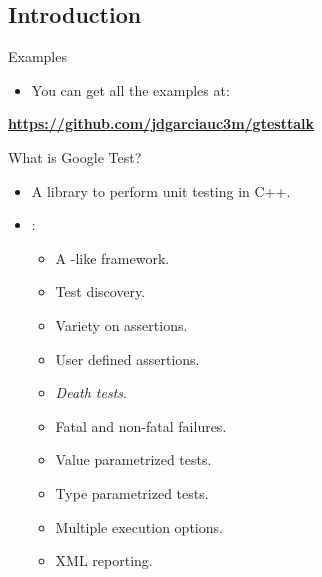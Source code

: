 \subsection{Introduction}

\begin{frame}[t]{Examples}
\begin{itemize}
  \item You can get all the examples at:
\end{itemize}
\vspace{1cm}
\large
\textbf{\url{https://github.com/jdgarciauc3m/gtesttalk}}
\end{frame}

\begin{frame}[t]{What is Google Test?}
\begin{itemize}
  \item A library to perform unit testing in C++.
  
  \vfill
  \item {}:
    \begin{itemize}
      \item A -like framework.
      \item Test discovery.
      \item Variety on assertions.
      \item User defined assertions.
      \item \emph{Death tests}.
      \item Fatal and non-fatal failures.
      \item Value parametrized tests.
      \item Type parametrized tests.
      \item Multiple execution options.
      \item XML reporting.
    \end{itemize}

\end{itemize}
\end{frame}

